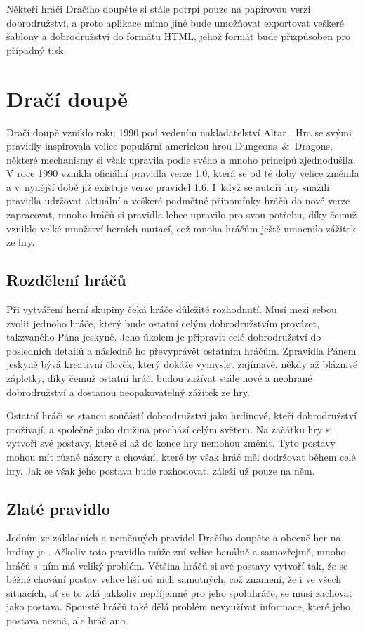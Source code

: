 \documentclass[thesis=B,czech]{resources/FITthesis}[2012/06/26]
\begin{document}
Někteří hráči Dračího doupěte si stále potrpí pouze na papírovou verzi dobrodružství, a proto aplikace mimo jiné bude umožňovat exportovat veškeré šablony a dobrodružství do formátu HTML, jehož formát bude přizpůsoben pro případný tisk. 

	\section{Dračí doupě}
	Dračí doupě vzniklo roku 1990 pod vedením nakladatelství Altar \cite{altar}. Hra se svými pravidly inspirovala velice populární americkou hrou Dungeons~\&~Dragons, některé mechanismy si však upravila podle svého a mnoho principů zjednodušila. V roce 1990 vznikla oficiální pravidla verze 1.0, která se od té doby velice změnila a v~nynější době již existuje verze pravidel 1.6. I~když se autoři hry snažili pravidla udržovat aktuální a veškeré podmětné připomínky hráčů do nové verze zapracovat, mnoho hráčů si pravidla lehce upravilo pro svou potřebu, díky čemuž vzniklo velké množství herních mutací, což mnoha hráčům ještě umocnilo zážitek ze hry. 
	
	\subsection{Rozdělení hráčů}
Při vytváření herní skupiny čeká hráče důležité rozhodnutí. Musí mezi sebou zvolit jednoho hráče, který bude ostatní celým dobrodružstvím provázet, takzvaného Pána jeskyně. Jeho úkolem je připravit celé dobrodružství do posledních detailů a následně ho převyprávět ostatním hráčům. Zpravidla Pánem jeskyně bývá kreativní člověk, který dokáže vymyslet zajímavé, někdy až bláznivé zápletky, díky čemuž ostatní hráči budou zažívat stále nové a neohrané dobrodružství a dostanou neopakovatelný zážitek ze hry. \par

Ostatní hráči se stanou součástí dobrodružství jako hrdinové, kteří dobrodružství prožívají, a společně jako družina prochází celým světem. Na začátku hry si vytvoří své postavy, které si až do konce hry nemohou změnit. Tyto postavy mohou mít různé názory a chování, které by však hráč měl dodržovat během celé hry. Jak se však jeho postava bude rozhodovat, záleží už pouze na něm.


	\subsection{Zlaté pravidlo}
Jedním ze základních a neměnných pravidel Dračího doupěte a obecně her na hrdiny je . Ačkoliv toto pravidlo může zní velice banálně a samozřejmě, mnoho hráčů s~ním má veliký problém. Většina hráčů si své postavy vytvoří tak, že se běžné chování postav velice liší od nich samotných, což znamení, že i ve všech situacích, ať se to zdá jakkoliv nepříjemné pro jeho spoluhráče, se musí zachovat jako postava. Spoustě hráčů také dělá problém nevyužívat informace, které jeho postava nezná, ale hráč ano. \par
\end{document}
